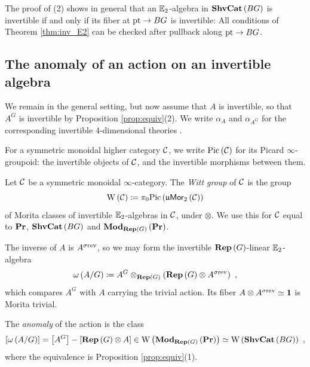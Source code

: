 \begin{rmk}
\label{rmk:inv_descent}
The proof of (2) shows in general that an $\mathbb{E}_2$-algebra in $\mathbf{ShvCat}\left(BG\right)$ is
invertible if and only if its fiber at $\text{pt}\to BG$ is invertible: All conditions of Theorem
\ref{thm:inv_E2} can be checked after pullback along $\text{pt}\to BG$.
\end{rmk}

\subsection{The anomaly of an action on an invertible algebra}
\label{sec:gauging_anomaly}

We remain in the general setting, but now assume that $A$ is invertible, so that $A^G$ is
invertible by Proposition \ref{prop:equiv}(2). We write $\alpha_A$ and $\alpha_{A^G}$ for the
corresponding invertible $4$-dimensional theories \cite{BJSS}.

\begin{nota}
\label{nota:Pic}
For a symmetric monoidal higher category $\mathcal{C}$, we write $\mathrm{Pic}\left(\mathcal{C}\right)$ for its
Picard $\infty$-groupoid: the invertible objects of $\mathcal{C}$, and the invertible morphisms between
them.
\end{nota}

\begin{defn}
\label{defn:Witt}
Let $\mathcal{C}$ be a symmetric monoidal $\infty$-category. The \emph{Witt group} of $\mathcal{C}$ is the
group
\begin{equation*}
\mathrm{W}\left(\mathcal{C}\right)\coloneqq\pi_0\mathrm{Pic}\left(\mathfrak{u}\mathsf{Mor}_2\left(\mathcal{C}\right)\right)
\end{equation*}
of Morita classes of invertible $\mathbb{E}_2$-algebras in $\mathcal{C}$, under $\otimes$. We use this for
$\mathcal{C}$ equal to $\mathbf{Pr}$, $\mathbf{ShvCat}\left(BG\right)$ and $\mathbf{Mod}_{\mathbf{Rep}\left(G\right)}\left(\mathbf{Pr}\right)$.
\end{defn}

The inverse of $A$ is $A^{\sigma\text{rev}}$, so we may form the invertible
$\mathbf{Rep}\left(G\right)$-linear $\mathbb{E}_2$-algebra
\begin{equation*}
\omega\left(A/G\right)\coloneqq
A^G\otimes_{\mathbf{Rep}\left(G\right)}\left(\mathbf{Rep}\left(G\right)\otimes A^{\sigma\text{rev}}\right) \ ,
\end{equation*}
which compares $A^G$ with $A$ carrying the trivial action.
Its fiber $A\otimes A^{\sigma\text{rev}}\simeq\mathbf{1}$ is Morita trivial.

\begin{defn}
\label{defn:anomaly}
The \emph{anomaly} of the action is the class
\begin{equation*}
\left[\omega\left(A/G\right)\right]
=\left[A^G\right]-\left[\mathbf{Rep}\left(G\right)\otimes A\right]
\in\mathrm{W}\left(\mathbf{Mod}_{\mathbf{Rep}\left(G\right)}\left(\mathbf{Pr}\right)\right)
\simeq\mathrm{W}\left(\mathbf{ShvCat}\left(BG\right)\right) \ ,
\end{equation*}
where the equivalence is Proposition \ref{prop:equiv}(1).
\end{defn}

